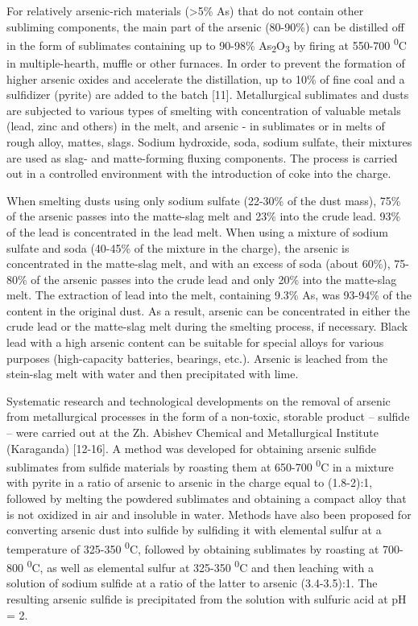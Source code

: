 \begin{multicols}{2}
For relatively arsenic-rich materials (\textgreater5\% As) that do not
contain other subliming components, the main part of the arsenic
(80-90\%) can be distilled off in the form of sublimates containing up
to 90-98\% As\textsubscript{2}O\textsubscript{3} by firing at 550-700
\textsuperscript{0}C in multiple-hearth, muffle or other furnaces. In
order to prevent the formation of higher arsenic oxides and accelerate
the distillation, up to 10\% of fine coal and a sulfidizer (pyrite) are
added to the batch {[}11{]}. Metallurgical sublimates and dusts are
subjected to various types of smelting with concentration of valuable
metals (lead, zinc and others) in the melt, and arsenic - in sublimates
or in melts of rough alloy, mattes, slags. Sodium hydroxide, soda,
sodium sulfate, their mixtures are used as slag- and matte-forming
fluxing components. The process is carried out in a controlled
environment with the introduction of coke into the charge.

When smelting dusts using only sodium sulfate (22-30\% of the dust
mass), 75\% of the arsenic passes into the matte-slag melt and 23\% into
the crude lead. 93\% of the lead is concentrated in the lead melt. When
using a mixture of sodium sulfate and soda (40-45\% of the mixture in
the charge), the arsenic is concentrated in the matte-slag melt, and
with an excess of soda (about 60\%), 75-80\% of the arsenic passes into
the crude lead and only 20\% into the matte-slag melt. The extraction of
lead into the melt, containing 9.3\% As, was 93-94\% of the content in
the original dust. As a result, arsenic can be concentrated in either
the crude lead or the matte-slag melt during the smelting process, if
necessary. Black lead with a high arsenic content can be suitable for
special alloys for various purposes (high-capacity batteries, bearings,
etc.). Arsenic is leached from the stein-slag melt with water and then
precipitated with lime.

Systematic research and technological developments on the removal of
arsenic from metallurgical processes in the form of a non-toxic,
storable product -- sulfide -- were carried out at the Zh. Abishev
Chemical and Metallurgical Institute (Karaganda) {[}12-16{]}. A method
was developed for obtaining arsenic sulfide sublimates from sulfide
materials by roasting them at 650-700 \textsuperscript{0}C in a mixture
with pyrite in a ratio of arsenic to arsenic in the charge equal to
(1.8-2):1, followed by melting the powdered sublimates and obtaining a
compact alloy that is not oxidized in air and insoluble in water.
Methods have also been proposed for converting arsenic dust into sulfide
by sulfiding it with elemental sulfur at a temperature of 325-350
\textsuperscript{0}C, followed by obtaining sublimates by roasting at
700-800 \textsuperscript{0}C, as well as elemental sulfur at 325-350
\textsuperscript{0}C and then leaching with a solution of sodium sulfide
at a ratio of the latter to arsenic (3.4-3.5):1. The resulting arsenic
sulfide is precipitated from the solution with sulfuric acid at pH = 2.


\end{multicols}
